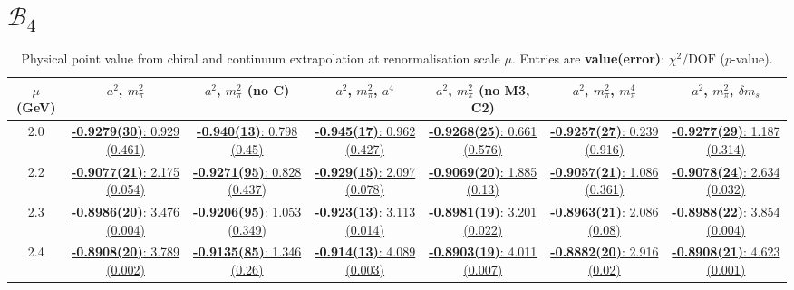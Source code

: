 \documentclass[12pt]{extarticle}
\begin{document}
\section{$\mathcal{B}_4$}
\begin{table}[h!]
\begin{center}
\begin{tabular}{|c|c|c|c|c|c|c|}
\hline
$\mu$ (GeV) & $a^2$, $m_\pi^2$& $a^2$, $m_\pi^2$ (no C)& $a^2$, $m_\pi^2$, $a^4$& $a^2$, $m_\pi^2$ (no M3, C2)& $a^2$, $m_\pi^2$, $m_\pi^4$& $a^2$, $m_\pi^2$, $\delta m_s$\\
\hline
2.0& \hyperlink{SSpPP/NPR/bag_a2m2_20.pdf.1}{\textbf{-0.9279(30)}: 0.929 (0.461)} & \hyperlink{SSpPP/NPR/bag_a2m2noC_20.pdf.1}{\textbf{-0.940(13)}: 0.798 (0.45)} & \hyperlink{SSpPP/NPR/bag_a2a4m2_20.pdf.1}{\textbf{-0.945(17)}: 0.962 (0.427)} & \hyperlink{SSpPP/NPR/bag_a2m2mcut_20.pdf.1}{\textbf{-0.9268(25)}: 0.661 (0.576)} & \hyperlink{SSpPP/NPR/bag_a2m2m4_20.pdf.1}{\textbf{-0.9257(27)}: 0.239 (0.916)} & \hyperlink{SSpPP/NPR/bag_a2m2delm_20.pdf.1}{\textbf{-0.9277(29)}: 1.187 (0.314)}\\
2.2& \hyperlink{SSpPP/NPR/bag_a2m2_22.pdf.1}{\textbf{-0.9077(21)}: 2.175 (0.054)} & \hyperlink{SSpPP/NPR/bag_a2m2noC_22.pdf.1}{\textbf{-0.9271(95)}: 0.828 (0.437)} & \hyperlink{SSpPP/NPR/bag_a2a4m2_22.pdf.1}{\textbf{-0.929(15)}: 2.097 (0.078)} & \hyperlink{SSpPP/NPR/bag_a2m2mcut_22.pdf.1}{\textbf{-0.9069(20)}: 1.885 (0.13)} & \hyperlink{SSpPP/NPR/bag_a2m2m4_22.pdf.1}{\textbf{-0.9057(21)}: 1.086 (0.361)} & \hyperlink{SSpPP/NPR/bag_a2m2delm_22.pdf.1}{\textbf{-0.9078(24)}: 2.634 (0.032)}\\
2.3& \hyperlink{SSpPP/NPR/bag_a2m2_23.pdf.1}{\textbf{-0.8986(20)}: 3.476 (0.004)} & \hyperlink{SSpPP/NPR/bag_a2m2noC_23.pdf.1}{\textbf{-0.9206(95)}: 1.053 (0.349)} & \hyperlink{SSpPP/NPR/bag_a2a4m2_23.pdf.1}{\textbf{-0.923(13)}: 3.113 (0.014)} & \hyperlink{SSpPP/NPR/bag_a2m2mcut_23.pdf.1}{\textbf{-0.8981(19)}: 3.201 (0.022)} & \hyperlink{SSpPP/NPR/bag_a2m2m4_23.pdf.1}{\textbf{-0.8963(21)}: 2.086 (0.08)} & \hyperlink{SSpPP/NPR/bag_a2m2delm_23.pdf.1}{\textbf{-0.8988(22)}: 3.854 (0.004)}\\
2.4& \hyperlink{SSpPP/NPR/bag_a2m2_24.pdf.1}{\textbf{-0.8908(20)}: 3.789 (0.002)} & \hyperlink{SSpPP/NPR/bag_a2m2noC_24.pdf.1}{\textbf{-0.9135(85)}: 1.346 (0.26)} & \hyperlink{SSpPP/NPR/bag_a2a4m2_24.pdf.1}{\textbf{-0.914(13)}: 4.089 (0.003)} & \hyperlink{SSpPP/NPR/bag_a2m2mcut_24.pdf.1}{\textbf{-0.8903(19)}: 4.011 (0.007)} & \hyperlink{SSpPP/NPR/bag_a2m2m4_24.pdf.1}{\textbf{-0.8882(20)}: 2.916 (0.02)} & \hyperlink{SSpPP/NPR/bag_a2m2delm_24.pdf.1}{\textbf{-0.8908(21)}: 4.623 (0.001)}\\
\hline
\end{tabular}
\caption{Physical point value from chiral and continuum extrapolation at renormalisation scale $\mu$. Entries are \textbf{value(error)}: $\chi^2/\text{DOF}$ ($p$-value).}
\end{center}
\end{table}
\end{document}
